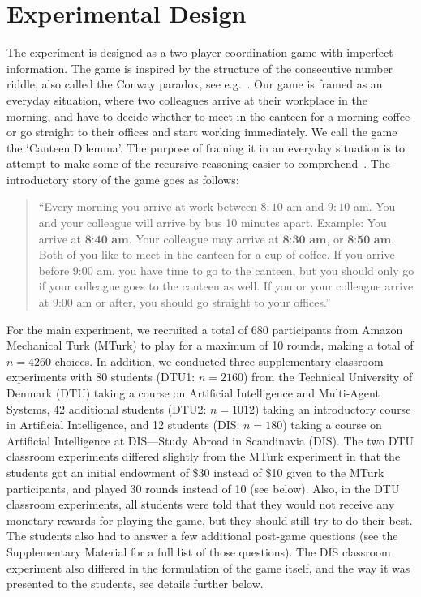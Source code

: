 \documentclass[twocolumn,a4paper,superscriptaddress,nofootinbib]{revtex4}
\begin{document}
\section{Experimental Design}\label{sect:experimental_design} 
The experiment is designed as a two-player coordination game with imperfect information. The game is inspired by the structure of the consecutive number riddle, also called the Conway paradox, see e.g.\ \citet{van1980conway,van2015one}. Our game is framed as an everyday situation, where two colleagues arrive at their workplace in the morning, and have to decide whether to meet in the canteen for a morning coffee or go straight to their offices and start working immediately. We call the game the `Canteen Dilemma'. The purpose of framing it in an everyday situation is to attempt to make some of the recursive reasoning easier to comprehend~\citep{meijering2010facilitative, wason1971natural}. The introductory story of the game goes as follows:
\begin{quote}
\indent
``Every morning you arrive at work between $8{:}10$ am and $9{:}10$ am. You and your colleague will arrive by bus 10 minutes apart. Example: You arrive at $\textbf{8:40 am}$. Your colleague may arrive at $\textbf{8:30  am}$, or $\textbf{8:50 am}$. Both of you like to meet in the canteen for a cup of coffee. If you arrive before 9:00 am, you have time to go to the canteen, but you should only go if your colleague goes to the canteen as well. If you or your colleague arrive at 9:00 am or after, you should go straight to your offices.''
\end{quote}
For the main experiment, we recruited a total of 680 participants from Amazon Mechanical Turk (MTurk) to play for a maximum of 10 rounds, making a total of $n=4260$ choices. In addition, we conducted three supplementary classroom experiments with 80 students (DTU1: $n=2160$) from the Technical University of Denmark (DTU) taking a course on Artificial Intelligence and Multi-Agent Systems, 42 additional students (DTU2: $n=1012$) taking an introductory course in Artificial Intelligence, and 12 students (DIS: $n=180$) taking a course on Artificial Intelligence at DIS---Study Abroad in Scandinavia (DIS). The two DTU classroom experiments differed slightly from the MTurk experiment in that the students got an initial endowment of \$30 instead of \$10 given to the MTurk participants, and played 30 rounds instead of 10 (see below). Also, in the DTU classroom experiments, all students were told that they would not receive any monetary rewards for playing the game, but they should still try to do their best. The students also had to answer a few additional post-game questions (see the Supplementary Material for a full list of those questions). The DIS classroom experiment also differed in the formulation of the game itself, and the way it was presented to the students, see details further below. 
\end{document}
